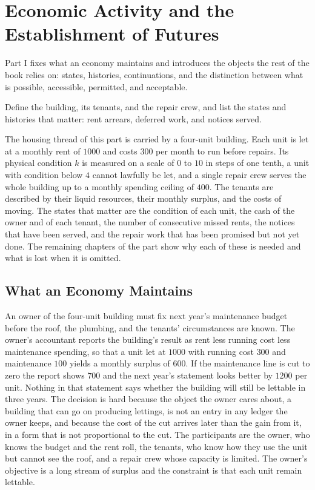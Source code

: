 \part{Economic Activity and the Establishment of Futures}
\label{part:I}

Part I fixes what an economy maintains and introduces the objects the rest of the book relies on: states, histories, continuations, and the distinction between what is possible, accessible, permitted, and acceptable.

\begin{housing}Define the building, its tenants, and the repair crew, and list the states and histories that matter: rent arrears, deferred work, and notices served.\end{housing}


The housing thread of this part is carried by a four-unit building. Each unit is let at a monthly rent of $1000$ and costs $300$ per month to run before repairs. Its physical condition $k$ is measured on a scale of $0$ to $10$ in steps of one tenth, a unit with condition below $4$ cannot lawfully be let, and a single repair crew serves the whole building up to a monthly spending ceiling of $400$. The tenants are described by their liquid resources, their monthly surplus, and the costs of moving. The states that matter are the condition of each unit, the cash of the owner and of each tenant, the number of consecutive missed rents, the notices that have been served, and the repair work that has been promised but not yet done. The remaining chapters of the part show why each of these is needed and what is lost when it is omitted.

\chapter{What an Economy Maintains}\label{ch:1}

An owner of the four-unit building must fix next year's maintenance budget before the roof, the plumbing, and the tenants' circumstances are known. The owner's accountant reports the building's result as rent less running cost less maintenance spending, so that a unit let at $1000$ with running cost $300$ and maintenance $100$ yields a monthly surplus of $600$. If the maintenance line is cut to zero the report shows $700$ and the next year's statement looks better by $1200$ per unit. Nothing in that statement says whether the building will still be lettable in three years. The decision is hard because the object the owner cares about, a building that can go on producing lettings, is not an entry in any ledger the owner keeps, and because the cost of the cut arrives later than the gain from it, in a form that is not proportional to the cut. The participants are the owner, who knows the budget and the rent roll, the tenants, who know how they use the unit but cannot see the roof, and a repair crew whose capacity is limited. The owner's objective is a long stream of surplus and the constraint is that each unit remain lettable.

